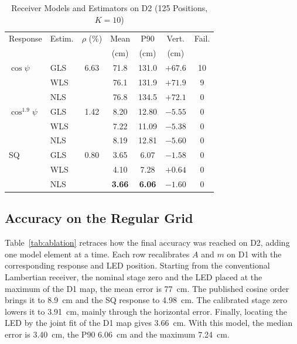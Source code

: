 
\begin{table}[!t]
 \centering
 \caption{Receiver Models and Estimators on D2 (125 Positions, $K=10$)}
 \label{tab:models}
 \footnotesize
 \setlength{\tabcolsep}{3.2pt}
 \begin{tabular}{@{}llccccc@{}}
 \toprule
 Response & Estim. & $\rho$ (\%) & Mean & P90 & Vert. & Fail.\\
 & & & (cm) & (cm) & (cm) & \\
 \midrule
 $\cos\psi$ & GLS & 6.63 & 71.8 & 131.0 & $+67.6$ & 10\\
 & WLS & & 76.1 & 131.9 & $+71.9$ & 9\\
 & NLS & & 76.8 & 134.5 & $+72.1$ & 0\\
 $\cos^{1.9}\psi$ & GLS & 1.42 & 8.20 & 12.80 & $-5.55$ & 0\\
 & WLS & & 7.22 & 11.09 & $-5.38$ & 0\\
 & NLS & & 8.19 & 12.81 & $-5.60$ & 0\\
 SQ & GLS & 0.80 & 3.65 & 6.07 & $-1.58$ & 0\\
 & WLS & & 4.10 & 7.28 & $+0.64$ & 0\\
 & NLS & & \textbf{3.66} & \textbf{6.06} & $-1.60$ & 0\\
 \bottomrule
 \end{tabular}
\end{table}

\subsection{Accuracy on the Regular Grid}
\label{subsec:res-grid}
Table~\ref{tab:ablation} retraces how the final accuracy was reached on D2, adding one model element at a time. Each row recalibrates $A$ and $m$ on D1 with the corresponding response and LED position. Starting from the conventional Lambertian receiver, the nominal stage zero and the LED placed at the maximum of the D1 map, the mean error is 77~cm. The published cosine order brings it to 8.9~cm and the SQ response to 4.98~cm. The calibrated stage zero lowers it to 3.91~cm, mainly through the horizontal error. Finally, locating the LED by the joint fit of the D1 map gives 3.66~cm. With this model, the median error is 3.40~cm, the P90 6.06~cm and the maximum 7.24~cm.


